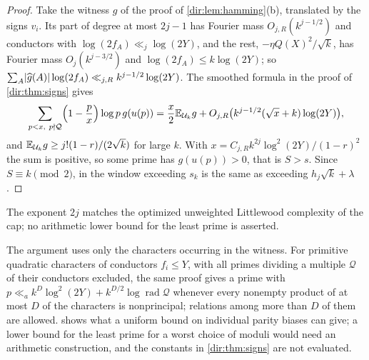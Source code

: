 \begin{proof}
Take the witness $g$ of the proof of \cref{dir:lem:hamming}(b), translated by the signs $v_i$. Its part
of degree at most $2j-1$ has Fourier mass $O_{j,R}(k^{j-1/2})$ and conductors with $\log(2f_A)\ll_j\log(2Y)$,
and the rest, $-\eta Q(X)^2/\sqrt k$, has Fourier mass $O_j(k^{j-3/2})$ and $\log(2f_A)\le k\log(2Y)$; so
$\sum_A\lvert\widehat g(A)\rvert\log(2f_A)\ll_{j,R}k^{j-1/2}\log(2Y)$. The smoothed formula in the proof of
\cref{dir:thm:signs} gives
\[
 \sum_{p<x,\ p\nmid\mathcal Q}\Bigl(1-\frac px\Bigr)\log p\,g(u(p))=\frac x2\mathbb{E}_{\mathcal U_k}g
 +O_{j,R}\bigl(k^{j-1/2}(\sqrt x+k)\log(2Y)\bigr),
\]
and $\mathbb{E}_{\mathcal U_k}g\ge j!(1-r)/(2\sqrt k)$ for large $k$. With
$x=C_{j,R}k^{2j}\log^2(2Y)/(1-r)^2$ the sum is positive, so some prime has $g(u(p))>0$, that is $S>s$. Since
$S\equiv k\pmod2$, in the window exceeding $s_k$ is the same as exceeding $h_j\sqrt k+\lambda$.
\end{proof}

The exponent $2j$ matches the optimized unweighted Littlewood complexity of the cap; no arithmetic
lower bound for the least prime is asserted.

The argument uses only the characters occurring in the witness. For primitive quadratic
characters of conductors $f_i\le Y$, with all primes dividing a multiple $\mathcal Q$ of their
conductors excluded, the same proof gives a prime with $p\ll_ak^D\log^2(2Y)+k^{D/2}\log
\operatorname{rad}\mathcal Q$ whenever every nonempty product of at most $D$ of the characters is
nonprincipal; relations among more than $D$ of them are allowed.  shows what
a uniform bound on individual parity biases can give; a lower bound for the least prime for a
worst choice of moduli would need an arithmetic construction, and the constants in
\cref{dir:thm:signs} are not evaluated.


